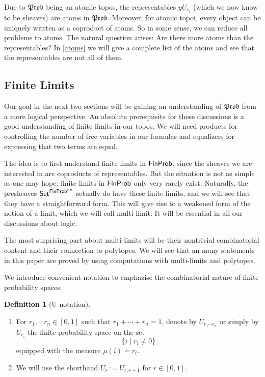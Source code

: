 \documentclass[a4paper]{amsproc}
\theoremstyle{plain}
\theoremstyle{definition}
\newtheorem{definition}[theorem]{Definition}
\theoremstyle{remark}
\numberwithin{equation}{section}
\newcommand{\y}{\textit{y}}
\newcommand{\Set}{\textup{\textsf{Set}}}
\newcommand{\FinProb}{\textup{\textsf{FinProb}}}
\newcommand{\Prob}{\mathfrak{Prob}}
\begin{document}
Due to $\Prob$ being an atomic topos, the representables $\y U_{r_i}$ (which we now know to be sheaves) are atoms in $\Prob$. Moreover, for atomic topoi, every object can be uniquely written as a coproduct of atoms. So in some sense, we can reduce all problems to atoms. The natural question arises: Are there more atoms than the representables? In \ref{atoms} we will give a complete list of the atoms and see that the representables are not all of them.


\subsection{Finite Limits}

Our goal in the next two sections will be gaining an understanding of $\Prob$ from a more logical perspective. An absolute prerequisite for these discussions is a good understanding of finite limits in our topos. We will need products for controlling the number of free variables in our formulas and equalizers for expressing that two terms are equal.

The idea is to first understand finite limits in $\FinProb$, since the sheaves we are interested in are coproducts of representables. But the situation is not as simple as one may hope: finite limits in $\FinProb$ only very rarely exist. Naturally, the presheaves $\Set^{\FinProb^{op}}$ actually do have these finite limits, and we will see that they have a straightforward form. This will give rise to a weakened form of the notion of a limit, which we will call multi-limit. It will be essential in all our discussions about logic.

The most surprising part about multi-limits will be their nontrivial combinatorial content and their connection to polytopes. We will see that an many statements in this paper are proved by using computations with multi-limits and polytopes.

We introduce convenient notation to emphazise the combinatorial nature of finite probability spaces.

\begin{definition}[U-notation] \label{U-notation}
    \mbox{}
    \begin{enumerate}
        \item For $r_1, \cdots r_n \in [0,1]$ such that $r_1 + \cdots + r_n = 1$, denote by $U_{r_1 \cdots r_n}$ or simply by $U_{r_i}$ the finite probability space on the set
        \[
        \{i \mid r_i \neq 0 \}
        \]
        equipped with the measure $\mu(i) = r_i$.
        \item We will use the shorthand $U_r := U_{r,r-1}$ for $r \in [0,1]$.
    \end{enumerate}
\end{definition}
\end{document}
